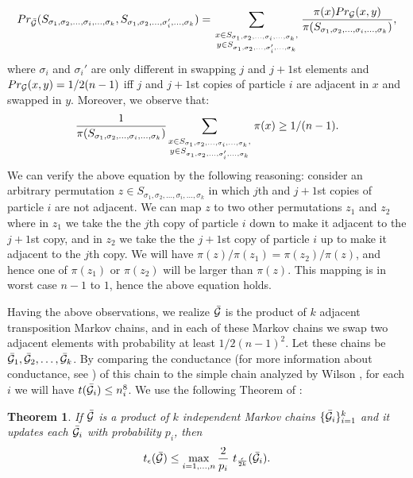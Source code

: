 \documentclass[10 pt]{article}
\newcommand{\G}{{\cal G}}
\newtheorem{thm}{Theorem}[section]
\begin{document}
$$Pr_{\bar{\G}}(S_{\sigma_1,\sigma_2, \dots,\sigma_i,\dots, \sigma_k},S_{\sigma_1,\sigma_2, \dots,\sigma'_i,\dots, \sigma_k})={ \displaystyle \sum_{\atop{\substack{
x\in S_{\sigma_1,\sigma_2, \dots,\sigma_i,\dots, \sigma_k},\\y\in S_{\sigma_1,\sigma_2, \dots,\sigma'_i,\dots, \sigma_k}}}
} \frac{\pi(x)Pr_{\G}(x,y)}{{\pi(S_{\sigma_1,\sigma_2, \dots,\sigma_i,\dots, \sigma_k})}}},$$
where  $\sigma_i$ and $\sigma_i'$ are only different in swapping  $j$ and $j+1$st elements and
$Pr_{\G}(x,y)=1/2(n-1)$ iff $j$ and $j{+}1$st copies of particle $i$ are adjacent in $x$ and swapped in $y$. 
Moreover, we observe that:
 $$\frac{1}{{\pi(S_{\sigma_1,\sigma_2, \dots,\sigma_i,\dots, \sigma_k})}}{ \displaystyle \sum_{\atop{\substack{
x\in S_{\sigma_1,\sigma_2, \dots,\sigma_i,\dots, \sigma_k},\\y\in S_{\sigma_1,\sigma_2, \dots,\sigma'_i,\dots, \sigma_k}}}
} \pi(x)} \geq1/(n-1).$$
We can verify the above equation by the following reasoning: consider an arbitrary permutation
$z\in S_{\sigma_1,\sigma_2, \dots,\sigma_i,\dots, \sigma_k}$ in which $j$th and $j{+}1$st copies of particle $i$ are not adjacent.
We can map $z$ to two other permutations $z_1$ and $z_2$ where in $z_1$ we take the the $j$th copy of particle $i$ down to make it
adjacent to the $j{+}1$st copy, and in  $z_2$ we take the the $j{+}1$st copy of particle $i$ up to make it adjacent to the $j$th copy.
We will have $\pi(z)/\pi(z_1)=\pi(z_2)/\pi{(z)}$, and hence one of $\pi(z_1)$ or $\pi(z_2)$ will be larger than $\pi(z)$.
This mapping is in worst case $n{-}1$ to $1$, hence the above equation holds.  

Having the above observations, we realize $\bar{\G}$ is the product of $k$ adjacent transposition Markov chains, and in each of these
Markov chains we swap two adjacent elements with probability at least $1/2(n-1)^2$. Let these chains be $\bar{\G}_1,\bar{\G}_2,\dots, \bar{\G}_k$.
By comparing the conductance (for more information about conductance, see \cite{MCBook}) of this chain to the simple chain analyzed
by Wilson \cite{Wilson}, for each $i$ we will have $t(\bar{\G}_i)\leq {n}_i^8$. 
We use the following Theorem of \cite{Dana}:

\begin{thm}\label{product}
If  $\bar{\G}$ is a product of $k$ independent Markov chains $\{\bar{\G}_i\}^{k}_{i=1}$
and it updates each  ${\bar{\G}_i}$ with probability $p_i$, then
$$t_{\epsilon}(\bar{\G})\leq \displaystyle \max_{i=1,\dots, n} \frac{2}{p_i}~ t_{\frac{\epsilon}{2k}}(\bar{\G}_i).$$
\end{thm}
\end{document}
